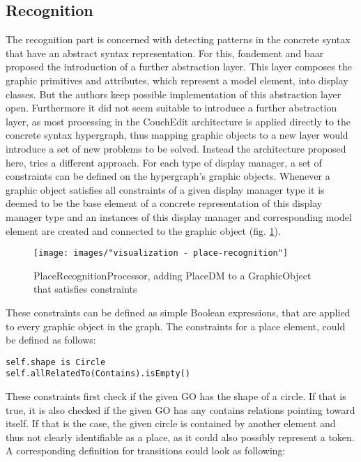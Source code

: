 \subsection{Recognition}
The recognition part is concerned with detecting patterns in the concrete syntax that have an abstract syntax representation. For this, fondement and baar proposed the introduction of a further abstraction layer. This layer composes the graphic primitives and attributes, which represent a model element, into display classes. But the authors keep possible implementation of this abstraction layer open. Furthermore it did not seem suitable to introduce a further abstraction layer, as most processing in the CouchEdit architecture is applied directly to the concrete syntax hypergraph, thus mapping graphic objects to a new layer would introduce a set of new problems to be solved. Instead the architecture proposed here, tries a different approach. For each type of display manager, a set of constraints can be defined on the hypergraph's graphic objects. Whenever a graphic object satisfies all constraints of a given display manager type it is deemed to be the base element of a concrete representation of this display manager type and an instances of this display manager and corresponding model element are created and connected to the graphic object (fig. \ref{fig:place-recognition}). 

\begin{figure}
  \centering
  \texttt{[image: images/"visualization - place-recognition"]}
  \caption{PlaceRecognitionProcessor, adding PlaceDM to a GraphicObject that satisfies constraints}
  \label{fig:place-recognition}
\end{figure}

These constraints can be defined as simple Boolean expressions, that are applied to every graphic object in the graph. The constraints for a place element, could be defined as follows: 

\begin{lstlisting}[language=OCL]
self.shape is Circle
self.allRelatedTo(Contains).isEmpty()
\end{lstlisting} 

These constraints first check if the given GO has the shape of a circle. If that is true, it is also checked if the given GO has any contains relations pointing toward itself. If that is the case, the given circle is contained by another element and thus not clearly identifiable as a place, as it could also possibly represent a token. A corresponding definition for transitions could look as following: 

